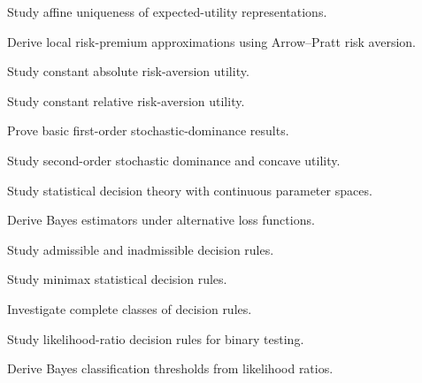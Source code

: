 \begin{exercise}[4]
Study affine uniqueness of expected-utility representations.
\end{exercise}

\begin{exercise}[4]
Derive local risk-premium approximations using Arrow--Pratt risk aversion.
\end{exercise}

\begin{exercise}[4]
Study constant absolute risk-aversion utility.
\end{exercise}

\begin{exercise}[4]
Study constant relative risk-aversion utility.
\end{exercise}

\begin{exercise}[4]
Prove basic first-order stochastic-dominance results.
\end{exercise}

\begin{exercise}[4]
Study second-order stochastic dominance and concave utility.
\end{exercise}

\begin{exercise}[4]
Study statistical decision theory with continuous parameter spaces.
\end{exercise}

\begin{exercise}[4]
Derive Bayes estimators under alternative loss functions.
\end{exercise}

\begin{exercise}[4]
Study admissible and inadmissible decision rules.
\end{exercise}

\begin{exercise}[4]
Study minimax statistical decision rules.
\end{exercise}

\begin{exercise}[4]
Investigate complete classes of decision rules.
\end{exercise}

\begin{exercise}[4]
Study likelihood-ratio decision rules for binary testing.
\end{exercise}

\begin{exercise}[4]
Derive Bayes classification thresholds from likelihood ratios.
\end{exercise}

